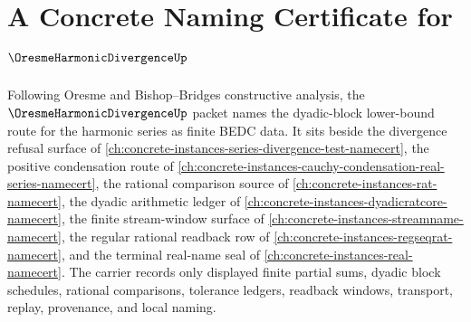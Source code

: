 \chapter{A Concrete Naming Certificate for $\OresmeHarmonicDivergenceUp$}
\label{ch:concrete-instances-oresme-harmonic-divergence-namecert}

Following Oresme and Bishop--Bridges constructive analysis, the $\OresmeHarmonicDivergenceUp$ packet names the dyadic-block lower-bound route for the harmonic series as finite BEDC data. It sits beside the divergence refusal surface of \autoref{ch:concrete-instances-series-divergence-test-namecert}, the positive condensation route of \autoref{ch:concrete-instances-cauchy-condensation-real-series-namecert}, the rational comparison source of \autoref{ch:concrete-instances-rat-namecert}, the dyadic arithmetic ledger of \autoref{ch:concrete-instances-dyadicratcore-namecert}, the finite stream-window surface of \autoref{ch:concrete-instances-streamname-namecert}, the regular rational readback row of \autoref{ch:concrete-instances-regseqrat-namecert}, and the terminal real-name seal of \autoref{ch:concrete-instances-real-namecert}. The carrier records only displayed finite partial sums, dyadic block schedules, rational comparisons, tolerance ledgers, readback windows, transport, replay, provenance, and local naming.

